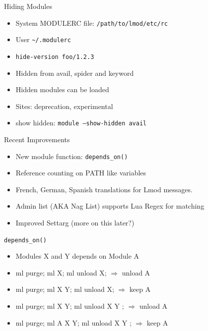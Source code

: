 \documentclass{beamer}
\begin{document}
\begin{frame}{Hiding Modules}
  \begin{itemize}
    \item System MODULERC file: \texttt{/path/to/lmod/etc/rc}
    \item User \texttt{\textasciitilde/.modulerc}
    \item \texttt{\color{blue}hide-version foo/1.2.3}
    \item Hidden from avail, spider and keyword
    \item Hidden modules can be loaded
    \item Sites: deprecation, experimental
    \item show hidden: \texttt{module --show-hidden avail}
  \end{itemize}
\end{frame}


\begin{frame}{Recent Improvements}
  \begin{itemize}
    \item New module function: \texttt{depends\_on()}
    \item Reference counting on PATH like variables
    \item French, German, Spanish translations for Lmod messages.
    \item Admin list (AKA Nag List) supports Lua Regex for matching
    \item Improved Settarg (more on this later?)
  \end{itemize}
\end{frame}

\begin{frame}{\texttt{depends\_on()}}
  \begin{itemize}
    \item Modules X and Y depends on Module A
    \item ml purge; ml X; ml unload X;      $\Rightarrow$ unload A
    \item ml purge; ml X Y; ml unload X;    $\Rightarrow$ keep A
    \item ml purge; ml X Y; ml unload X Y ; $\Rightarrow$ unload A
    \item ml purge; ml A X Y; ml unload X Y ; $\Rightarrow$ keep A
  \end{itemize}
\end{frame}
\end{document}
